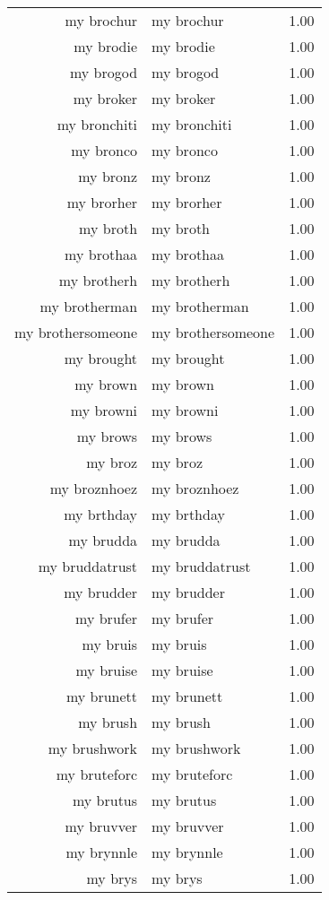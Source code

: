 \begin{table}[ht]
\begin{tabular}{rlr}
  my brochur & my brochur & 1.00 \\ 
  my brodie & my brodie & 1.00 \\ 
  my brogod & my brogod & 1.00 \\ 
  my broker & my broker & 1.00 \\ 
  my bronchiti & my bronchiti & 1.00 \\ 
  my bronco & my bronco & 1.00 \\ 
  my bronz & my bronz & 1.00 \\ 
  my brorher & my brorher & 1.00 \\ 
  my broth & my broth & 1.00 \\ 
  my brothaa & my brothaa & 1.00 \\ 
  my brotherh & my brotherh & 1.00 \\ 
  my brotherman & my brotherman & 1.00 \\ 
  my brothersomeone & my brothersomeone & 1.00 \\ 
  my brought & my brought & 1.00 \\ 
  my brown & my brown & 1.00 \\ 
  my browni & my browni & 1.00 \\ 
  my brows & my brows & 1.00 \\ 
  my broz & my broz & 1.00 \\ 
  my broznhoez & my broznhoez & 1.00 \\ 
  my brthday & my brthday & 1.00 \\ 
  my brudda & my brudda & 1.00 \\ 
  my bruddatrust & my bruddatrust & 1.00 \\ 
  my brudder & my brudder & 1.00 \\ 
  my brufer & my brufer & 1.00 \\ 
  my bruis & my bruis & 1.00 \\ 
  my bruise & my bruise & 1.00 \\ 
  my brunett & my brunett & 1.00 \\ 
  my brush & my brush & 1.00 \\ 
  my brushwork & my brushwork & 1.00 \\ 
  my bruteforc & my bruteforc & 1.00 \\ 
  my brutus & my brutus & 1.00 \\ 
  my bruvver & my bruvver & 1.00 \\ 
  my brynnle & my brynnle & 1.00 \\ 
  my brys & my brys & 1.00 \\ 

\end{tabular}
\end{table}
